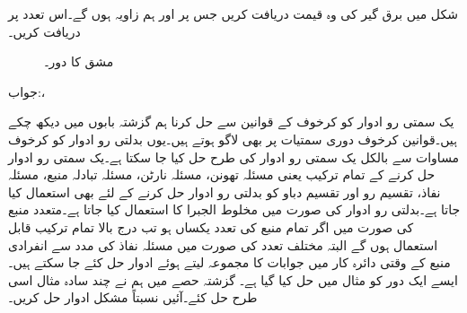 شکل  میں برق گیر کی وہ قیمت دریافت کریں جس پر  اور  ہم زاویہ ہوں گے۔اس تعدد پر  دریافت کریں۔
\begin{figure}
\centering
{}
\caption{مشق  کا دور۔}
\label{شکل_بدلتا_دو_پرزے_متوازی_ب}
\end{figure}

جواب:، 

یک سمتی رو ادوار کو کرخوف کے قوانین سے حل کرنا ہم گزشتہ بابوں میں دیکھ چکے ہیں۔قوانین کرخوف دوری سمتیات پر بھی لاگو ہوتے ہیں۔یوں بدلتی رو ادوار کو کرخوف مساوات سے بالکل یک سمتی رو ادوار کی طرح حل کیا جا سکتا ہے۔یک سمتی رو ادوار حل کرنے کے تمام ترکیب یعنی مسئلہ تھونن، مسئلہ نارٹن، مسئلہ تبادلہ منبع، مسئلہ نفاذ، تقسیم رو اور تقسیم دباو کو بدلتی رو ادوار حل کرنے کے لئے بھی استعمال کیا جاتا ہے۔بدلتی رو ادوار کی صورت میں مخلوط الجبرا کا استعمال کیا جاتا ہے۔متعدد منبع کی صورت میں اگر تمام منبع کی تعدد یکساں ہو تب درج بالا تمام ترکیب قابل استعمال ہوں گے البتہ مختلف تعدد کی صورت میں مسئلہ نفاذ کی مدد سے انفرادی منبع کے وقتی دائرہ کار میں جوابات کا مجموعہ لیتے ہوئے ادوار حل کئے جا سکتے ہیں۔ایسے ایک دور کو مثال  میں حل کیا گیا ہے۔ گزشتہ حصے میں ہم نے چند سادہ مثال اسی طرح حل کئے۔آئیں نسبتاً مشکل ادوار حل کریں۔


